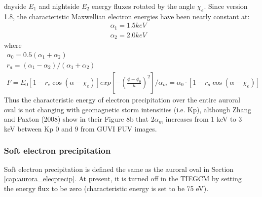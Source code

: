 \begin{enumerate}
\begin{enumerate}
dayside $E_1$ and nightside $E_2$ energy fluxes rotated by the angle
$\chi_e$.  Since version 1.8, the characteristic Maxwellian electron
energies have been nearly constant at:
%
\begin{equation}
  \begin{split}
    \alpha_1 = 1.5 keV \\
    \alpha_2 = 2.0 keV
    \label{eq:aurora_9}
  \end{split}
\end{equation}
%   
where
\begin{equation}
  \begin{split}
    \alpha_0 = 0.5(\alpha_1+\alpha_2) \\
    r_a = (\alpha_1-\alpha_2)/(\alpha_1+\alpha_2) \\
   F = E_0 [1-r_e \cos(\alpha - \chi_e)]exp[-(\frac{\phi-\phi_0}{h})^2]/ 
    \alpha_m = \alpha_0 \cdot [1 - r_a \cos(\alpha - \chi_e)]
    \label{eq:aurora_8}
  \end{split}
\end{equation}
Thus the characteristic
energy of electron precipitation over the entire auroral oval is not 
changing with geomagnetic storm intensities (i.e. Kp), although Zhang
and Paxton (2008) \cite{zhang2008} show in their Figure 8b that
$2\alpha_m$ increases from 1 keV to 3 keV between Kp 0 and 9 from
GUVI FUV images.
%
\subsubsection{Soft electron precipitation}\label{cap:aurora_softelecprecip}
%
Soft electron precipitation is defined the same as the auroral oval in Section 
\ref{cap:aurora_elecprecip}. At present, it is turned off in the TIEGCM by setting 
the energy flux to be zero (characteristic energy is set to be 75 eV). 
%

\end{enumerate}
\end{enumerate}
